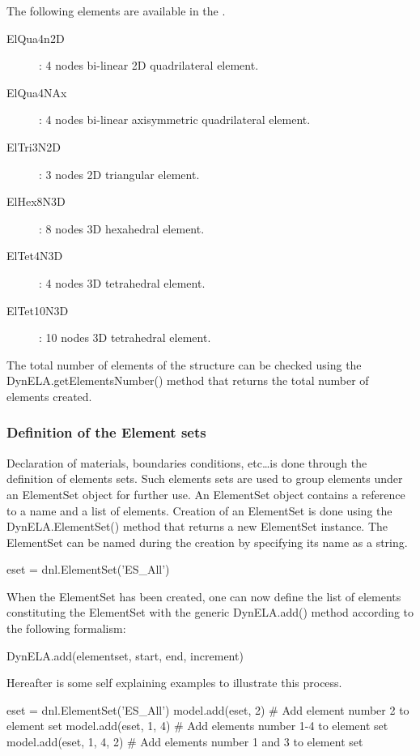 The following elements are available in the \DynELA.
\begin{description}
\item [ElQua4n2D]: 4 nodes bi-linear 2D quadrilateral element.
\item [ElQua4NAx]: 4 nodes bi-linear axisymmetric quadrilateral element.
\item [ElTri3N2D]: 3 nodes 2D triangular element.
\item [ElHex8N3D]: 8 nodes 3D hexahedral element.
\item [ElTet4N3D]: 4 nodes 3D tetrahedral element.
\item [ElTet10N3D]: 10 nodes 3D tetrahedral element.
\end{description}
The total number of elements of the structure can be checked using the \textsf{DynELA.getElementsNumber()} method that returns the total number of elements created.

\subsubsection{Definition of the Element sets}

Declaration of materials, boundaries conditions, etc\ldots is done through the definition of elements sets. Such elements sets are used to group elements under an \textsf{ElementSet} object for further use. An \textsf{ElementSet} object contains a reference to a name and a list of elements. Creation of an \textsf{ElementSet} is done using the \textsf{DynELA.ElementSet()} method that returns a new \textsf{ElementSet} instance. The \textsf{ElementSet} can be named during the creation by specifying its name as a string.

\begin{PythonListing}
eset = dnl.ElementSet('ES_All')
\end{PythonListing}

When the \textsf{ElementSet} has been created, one can now define the list of elements constituting the \textsf{ElementSet} with the generic \textsf{DynELA.add()} method according to the following formalism:

\textsf{DynELA.add(elementset, start, end, increment)}

Hereafter is some self explaining examples to illustrate this process.

\begin{PythonListing}
eset = dnl.ElementSet('ES_All')
model.add(eset, 2)       # Add element number 2 to element set
model.add(eset, 1, 4)    # Add elements number 1-4 to element set
model.add(eset, 1, 4, 2) # Add elements number 1 and 3 to element set
\end{PythonListing}

